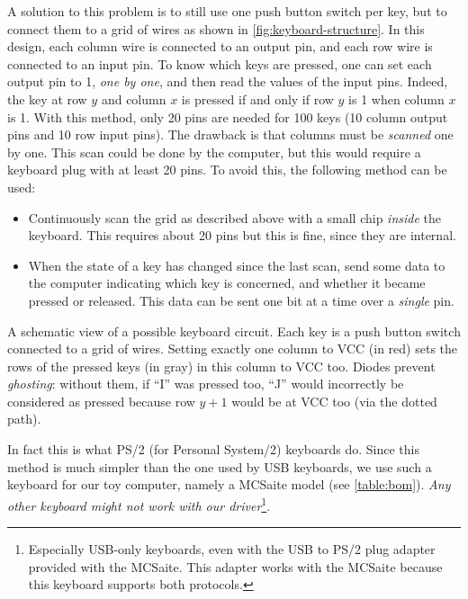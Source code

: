 A solution to this problem is to still use one push button switch per key, but
to connect them to a grid of wires as shown in \cref{fig:keyboard-structure}.
In this design, each column wire is connected to an output pin, and each row
wire is connected to an input pin. To know which keys are pressed, one can set
each output pin to 1, {\em one by one}, and then read the values of the input
pins. Indeed, the key at row $y$ and column $x$ is pressed if and only if row
$y$ is 1 when column $x$ is 1. With this method, only 20 pins are needed for
100 keys (10 column output pins and 10 row input pins). The drawback is that
columns must be {\em scanned} one by one. This scan could be done by the
computer, but this would require a keyboard plug with at least 20 pins. To
avoid this, the following method can be used:
\begin{itemize}
  \item Continuously scan the grid as described above with a small chip {\em
  inside} the keyboard. This requires about 20 pins but this is fine, since
  they are internal.

  \item When the state of a key has changed since the last scan, send some data
  to the computer indicating which key is concerned, and whether it became
  pressed or released. This data can be sent one bit at a time over a {\em
  single} pin.
\end{itemize}

\begin{Figure}
  

  \caption{A schematic view of a possible keyboard circuit. Each key is a push
  button switch connected to a grid of wires. Setting exactly one column to VCC
  (in red) sets the rows of the pressed keys (in gray) in this column to VCC
  too. Diodes prevent {\em ghosting}: without them, if ``I'' was pressed too,
  ``J'' would incorrectly be considered as pressed because row $y+1$ would be
  at VCC too (via the dotted path).}\label{fig:keyboard-structure}
\end{Figure}

\noindent In fact this is what PS/2 (for Personal System/2) keyboards do. Since
this method is much simpler than the one used by USB keyboards, we use such a
keyboard for our toy computer, namely a MCSaite model (see \cref{table:bom}).
{\em Any other keyboard might not work with our driver}\footnote{Especially
USB-only keyboards, even with the USB to PS/2 plug adapter provided with the
MCSaite. This adapter works with the MCSaite because this keyboard supports
both protocols.}.

